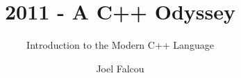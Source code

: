 \documentclass{beamer}
\title{2011 - A C++ Odyssey}
\subtitle{Introduction to the Modern C++ Language}
\author{Joel Falcou}
\institute{Laboratoire de Recherche en Informatique - Université Paris Sud 11}
\date{}
\begin{document}
\begin{frame}[plain]
\titlepage
\end{frame}

%

%

%

%

%
\end{document}
